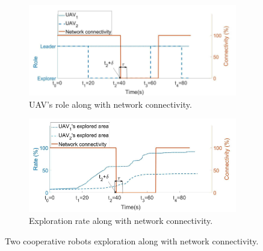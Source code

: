 \documentclass[11pt,openany]{book}
\begin{document}
\begin{figure}[H]
    \centering
    \begin{subfigure}[H]{0.8\linewidth}
        \includegraphics[width=\linewidth]{assets/4_11_a.png}
        \caption{{UAV’s role along with network connectivity.}}
        \label{fig:4.11a}
    \end{subfigure}
    \begin{subfigure}[H]{0.8\linewidth}
        \includegraphics[width=\linewidth]{assets/4_11_b.png}
        \caption{{Exploration rate along with network connectivity.}}
        \label{fig:4.11b}
    \end{subfigure}
    \caption{{Two cooperative robots exploration along with network connectivity.}}
    \label{fig:4.11}
\end{figure}
\end{document}

